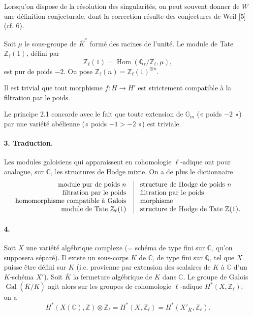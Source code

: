 \documentclass[10pt]{article}
\newcommand{\C}{\mathbb C}
\newcommand{\Q}{\mathbb Q}
\newcommand{\Z}{\mathbb Z}
\newcommand{\Ql}{\mathbb Q_\ell}
\newcommand{\Zl}{\mathbb Z_\ell}
\newcommand{\Gm}{\mathbb G_m}
\newcommand{\Gal}{\operatorname{Gal}}
\newcommand{\Hom}{\operatorname{Hom}}
\newcommand{\barK}{\overline{K}}
\begin{document}
Lorsqu'on dispose de la résolution des singularités, on peut souvent donner de $W$ une définition conjecturale, dont la correction résulte des conjectures de Weil [5] (cf. 6).

Soit $\mu$ le sous-groupe de $\barK^*$ formé des racines de l'unité. Le module de Tate $\Zl(1)$, défini par
\[
\Zl(1)=\Hom(\Ql/\Zl,\mu),
\]
est pur de poids $-2$. On pose $\Zl(n)=\Zl(1)^{\otimes n}$.

Il est trivial que tout morphisme $f:H\to H'$ est strictement compatible à la filtration par le poids.

Le principe 2.1 concorde avec le fait que toute extension de $\Gm$ (« poids $-2$ ») par une variété abélienne (« poids $-1>-2$ ») est triviale.

\paragraph{3. Traduction.} Les modules galoisiens qui apparaissent en cohomologie $\ell$-adique ont pour analogue, sur $\C$, les structures de Hodge mixte. On a de plus le dictionnaire
\[
\begin{array}{r@{\quad\vrule\quad}l}
\text{module pur de poids }n & \text{structure de Hodge de poids }n\\
\text{filtration par le poids} & \text{filtration par le poids}\\
\text{homomorphisme compatible à Galois} & \text{morphisme}\\
\text{module de Tate }\Zl(1) & \text{structure de Hodge de Tate }\Z(1).
\end{array}
\]

\paragraph{4.} Soit $X$ une variété algébrique complexe (= schéma de type fini sur $\C$, qu'on supposera séparé). Il existe un sous-corps $K$ de $\C$, de type fini sur $\Q$, tel que $X$ puisse être défini sur $K$ (i.e. provienne par extension des scalaires de $K$ à $\C$ d'un $K$-schéma $X'$). Soit $\barK$ la fermeture algébrique de $K$ dans $\C$. Le groupe de Galois $\Gal(\barK/K)$ agit alors sur les groupes de cohomologie $\ell$-adique $H^*(X,\Zl)$; on a
\[
H^*(X(\C),\Z)\otimes\Zl=H^*(X,\Zl)=H^*(X'_{\barK},\Zl).
\]
\end{document}
